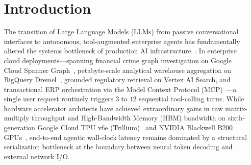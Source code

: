 \documentclass[10pt,conference]{IEEEtran}
\begin{document}
\section{Introduction}
\label{sec:intro}

The transition of Large Language Models (LLMs) from passive conversational interfaces to autonomous, tool-augmented enterprise agents has fundamentally altered the systems bottleneck of production AI infrastructure~\cite{yao2023react, schick2023toolformer, qin2024toolllm, patil2024gorilla, gemini2025report}. In enterprise cloud deployments---spanning financial crime graph investigation on Google Cloud Spanner Graph~\cite{corbett2012spanner, iso2024gql}, petabyte-scale analytical warehouse aggregation on BigQuery Dremel~\cite{melnik2010dremel}, grounded regulatory retrieval on Vertex AI Search, and transactional ERP orchestration via the Model Context Protocol (MCP)~\cite{anthropic2024mcp, wang2025mcpbench, lumer2025scalemcp, gan2025ragmcp}---a single user request routinely triggers $3$ to $12$ sequential tool-calling turns. While hardware accelerator architects have achieved extraordinary gains in raw matrix-multiply throughput and High-Bandwidth Memory (HBM) bandwidth on sixth-generation Google Cloud TPU v6e (Trillium)~\cite{google2024trillium} and NVIDIA Blackwell B200 GPUs~\cite{nvidia2024blackwell}, end-to-end agentic wall-clock latency remains dominated by a structural serialization bottleneck at the boundary between neural token decoding and external network I/O.
\end{document}

